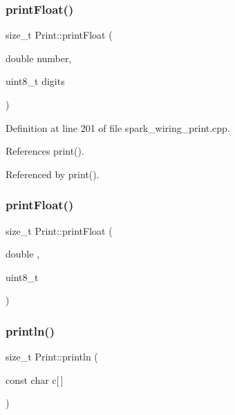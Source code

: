 \mbox{\label{class_print_a449fd5f2ab1fb43c3e3b10f53d18b1e8}} 
\subsubsection{\texorpdfstring{print\+Float()}{printFloat()}\hspace{0.1cm}{\footnotesize\ttfamily [1/2]}}
{\footnotesize\ttfamily size\+\_\+t Print\+::print\+Float (\begin{DoxyParamCaption}\item[{double}]{number,  }\item[{uint8\+\_\+t}]{digits }\end{DoxyParamCaption})\hspace{0.3cm}{\ttfamily [private]}}



Definition at line 201 of file spark\+\_\+wiring\+\_\+print.\+cpp.



References print().



Referenced by print().

\mbox{\label{class_print_a449fd5f2ab1fb43c3e3b10f53d18b1e8}} 
\subsubsection{\texorpdfstring{print\+Float()}{printFloat()}\hspace{0.1cm}{\footnotesize\ttfamily [2/2]}}
{\footnotesize\ttfamily size\+\_\+t Print\+::print\+Float (\begin{DoxyParamCaption}\item[{double}]{,  }\item[{uint8\+\_\+t}]{ }\end{DoxyParamCaption})\hspace{0.3cm}{\ttfamily [private]}}

\mbox{\label{class_print_ad337ce3f7977411b7d34d47a51e5737e}} 
\subsubsection{\texorpdfstring{println()}{println()}\hspace{0.1cm}{\footnotesize\ttfamily [1/21]}}
{\footnotesize\ttfamily size\+\_\+t Print\+::println (\begin{DoxyParamCaption}\item[{const char}]{c\mbox{[}$\,$\mbox{]} }\end{DoxyParamCaption})}



